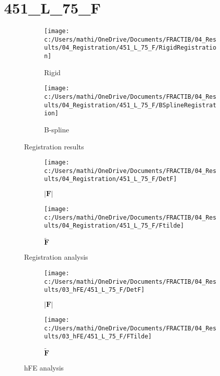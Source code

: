 \documentclass{article}%
\begin{document}
%
\newpage%
\section*{451\_L\_75\_F}%
\label{sec:451L75F}%


\begin{figure}[h!]%
\begin{subfigure}[b]{0.5\linewidth}%
\texttt{[image: c:/Users/mathi/OneDrive/Documents/FRACTIB/04\_Results/04\_Registration/451\_L\_75\_F/RigidRegistration]}%
\caption{Rigid}%
\end{subfigure}%
\begin{subfigure}[b]{0.5\linewidth}%
\texttt{[image: c:/Users/mathi/OneDrive/Documents/FRACTIB/04\_Results/04\_Registration/451\_L\_75\_F/BSplineRegistration]}%
\caption{B{-}spline}%
\end{subfigure}%
\caption{Registration results}%
\end{figure}

%


\begin{figure}[h!]%
\begin{subfigure}[b]{0.5\linewidth}%
\texttt{[image: c:/Users/mathi/OneDrive/Documents/FRACTIB/04\_Results/04\_Registration/451\_L\_75\_F/DetF]}%
\caption{$|\mathbf{F}|$}%
\end{subfigure}%
\begin{subfigure}[b]{0.5\linewidth}%
\texttt{[image: c:/Users/mathi/OneDrive/Documents/FRACTIB/04\_Results/04\_Registration/451\_L\_75\_F/Ftilde]}%
\caption{$\tilde{\mathbf{F}}$}%
\end{subfigure}%
\caption{Registration analysis}%
\end{figure}

%


\begin{figure}[h!]%
\begin{subfigure}[b]{0.5\linewidth}%
\texttt{[image: c:/Users/mathi/OneDrive/Documents/FRACTIB/04\_Results/03\_hFE/451\_L\_75\_F/DetF]}%
\caption{$|\mathbf{F}|$}%
\end{subfigure}%
\begin{subfigure}[b]{0.5\linewidth}%
\texttt{[image: c:/Users/mathi/OneDrive/Documents/FRACTIB/04\_Results/03\_hFE/451\_L\_75\_F/FTilde]}%
\caption{$\tilde{\mathbf{F}}$}%
\end{subfigure}%
\caption{hFE analysis}%
\end{figure}
\end{document}
